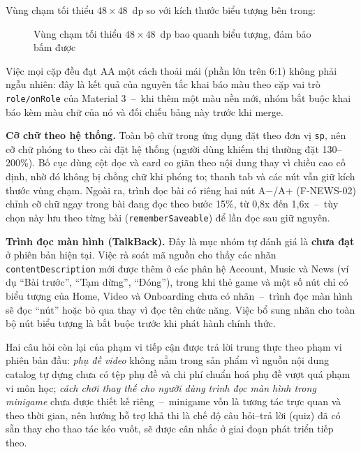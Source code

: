 \begin{table}[H]
Vùng chạm tối thiểu $48 \times 48$~dp so với kích thước biểu tượng bên trong:

\begin{figure}[H]
\centering
{}
\caption{Vùng chạm tối thiểu $48 \times 48$~dp bao quanh biểu tượng, đảm bảo bấm được}
\label{fig:touch-target}
\end{figure}
\end{table}

Việc mọi cặp đều đạt AA một cách thoải mái (phần lớn trên 6:1) không phải ngẫu nhiên: đây là kết quả của nguyên tắc khai báo màu theo cặp vai trò \texttt{role/onRole} của Material 3~--~khi thêm một màu nền mới, nhóm bắt buộc khai báo kèm màu chữ của nó và đối chiếu bảng này trước khi merge.

\textbf{Cỡ chữ theo hệ thống.} Toàn bộ chữ trong ứng dụng đặt theo đơn vị \texttt{sp}, nên cỡ chữ phóng to theo cài đặt hệ thống (người dùng khiếm thị thường đặt 130--200\%). Bố cục dùng cột dọc và card co giãn theo nội dung thay vì chiều cao cố định, nhờ đó không bị chồng chữ khi phóng to; thanh tab và các nút vẫn giữ kích thước vùng chạm. Ngoài ra, trình đọc bài có riêng hai nút A$-$/A$+$ (F-NEWS-02) chỉnh cỡ chữ ngay trong bài đang đọc theo bước 15\%, từ 0,8x đến 1,6x~--~tùy chọn này lưu theo từng bài (\texttt{rememberSaveable}) để lần đọc sau giữ nguyên.

\textbf{Trình đọc màn hình (TalkBack).} Đây là mục nhóm tự đánh giá là \textbf{chưa đạt} ở phiên bản hiện tại. Việc rà soát mã nguồn cho thấy các nhãn \texttt{contentDescription} mới được thêm ở các phân hệ Account, Music và News (ví dụ ``Bài trước'', ``Tạm dừng'', ``Đóng''), trong khi thẻ game và một số nút chỉ có biểu tượng của Home, Video và Onboarding chưa có nhãn~--~trình đọc màn hình sẽ đọc ``nút'' hoặc bỏ qua thay vì đọc tên chức năng. Việc bổ sung nhãn cho toàn bộ nút biểu tượng là bắt buộc trước khi phát hành chính thức.

Hai câu hỏi còn lại của phạm vi tiếp cận được trả lời trung thực theo phạm vi phiên bản đầu: \textit{phụ đề video} không nằm trong sản phẩm vì nguồn nội dung catalog tự dựng chưa có tệp phụ đề và chi phí chuẩn hoá phụ đề vượt quá phạm vi môn học; \textit{cách chơi thay thế cho người dùng trình đọc màn hình trong minigame} chưa được thiết kế riêng~--~minigame vốn là tương tác trực quan và theo thời gian, nên hướng hỗ trợ khả thi là chế độ câu hỏi--trả lời (quiz) đã có sẵn thay cho thao tác kéo vuốt, sẽ được cân nhắc ở giai đoạn phát triển tiếp theo.
